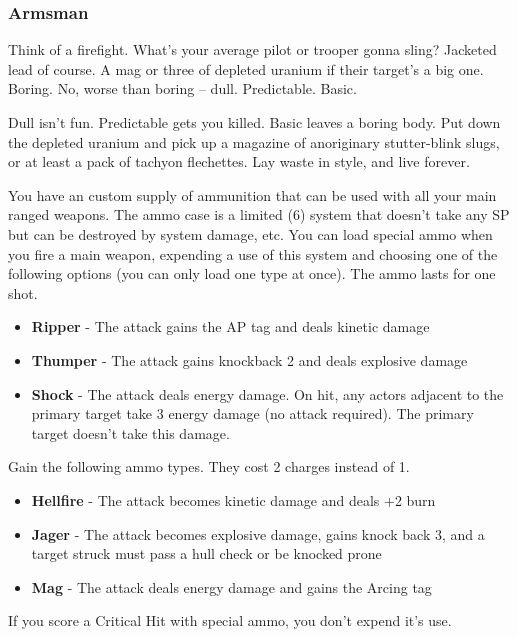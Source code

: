 \subsubsection{Armsman}

\begin{talent}
{Think of a firefight. What's your average pilot or trooper gonna sling? Jacketed lead of course. A mag or three of depleted uranium if their target's a big one. Boring. No, worse than boring -- dull. Predictable. Basic.

Dull isn't fun. Predictable gets you killed. Basic leaves a boring body. Put down the depleted uranium and pick up a magazine of anoriginary stutter-blink slugs, or at least a pack of tachyon flechettes. Lay waste in style, and live forever.}

  You have an custom supply of ammunition that can be used with all your main ranged weapons. The ammo case is a limited (6) system that doesn't take any SP but can be destroyed by system damage, etc. You can load special ammo when you fire a main weapon, expending a use of this system and choosing one of the following options (you can only load one type at once). The ammo lasts for one shot.
\begin{itemize}
\item \textbf{Ripper} - The attack gains the AP tag and deals kinetic damage 
\item \textbf{Thumper} - The attack gains knockback 2 and deals explosive damage 
\item \textbf{Shock} - The attack deals energy damage. On hit, any actors adjacent to the primary target take 3 energy damage (no attack required). The primary target doesn't take this damage.
\end{itemize}
Gain the following ammo types. They cost 2 charges instead of 1.
\begin{itemize}
\item \textbf{Hellfire} - The attack becomes kinetic damage and deals +2 burn 
\item \textbf{Jager} - The attack becomes explosive damage, gains knock back 3, and a target struck must pass a hull check or be knocked prone 
\item \textbf{Mag} - The attack deals energy damage and gains the Arcing tag
\end{itemize}
If you score a Critical Hit with special ammo, you don't expend it's use.
\end{talent}
